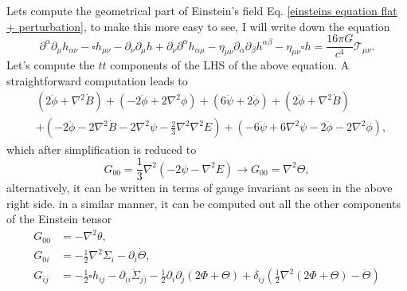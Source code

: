 \documentclass{article}
\begin{document}
Lets compute the geometrical part of Einstein's field Eq. 
\eqref{einsteins equation flat + perturbation}, to make this more easy to see, I will write 
down the equation
\begin{equation}
        \partial^{\alpha}\partial_{\mu}h_{\alpha\nu} 
        -  \square h_{\mu\nu} - \partial_{\nu}\partial_{\mu}h
        + \partial_{\nu}\partial^{\alpha}h_{\alpha\mu}
        - \eta_{\mu\nu}\partial_{\alpha}\partial_{\beta}h^{\alpha\beta} 
        - \eta_{\mu\nu}\square h = \frac{16\pi G}{c^4}\mathcal{T}_{\mu\nu}.
\end{equation}
Let's compute the $tt$ components of the LHS of the above equation. A straightforward
computation leads to
\begin{align}
    & \left(2\ddot{\phi} + \nabla^{2}\dot{B}\right) + \left(-2\ddot{\phi} + 2\nabla^2\phi\right)
    + \left(6\ddot{\psi} + 2\ddot{\phi}\right) + \left(2\ddot{\phi} + \nabla^2\dot{B}\right)\\
    & + \left(-2\ddot{\phi} - 2\nabla^2 \dot{B} -2\nabla^2\psi - \frac{2}{3}\nabla^2\nabla^2E\right)
    +\left(-6\ddot{\psi} + 6\nabla^2\psi -2\ddot{\phi} - 2\nabla^2\phi\right), 
\end{align}
which after simplification is reduced to
\begin{equation}
    G_{00} = \frac{1}{3}\nabla^2\left(-2\psi - \nabla^2 E\right) \to
    G_{00} = \nabla^2\Theta,
\end{equation}
alternatively, it can be written in terms of gauge invariant as seen in the above right side. in
a similar manner, it can be computed out all the other components of the Einstein tensor
\begin{align}
    G_{00} & = -\nabla^2\theta, \\
    G_{0i} & = -\frac{1}{2}\nabla^2\Sigma_i -\partial_{i}\dot{\Theta},\\
    G_{ij} & = -\frac{1}{2}\square h_{ij} - \partial_{(i}\dot{\Sigma}_{j)} - \frac{1}{2}\partial_{i}
    \partial_{j}\left(2\Phi + \Theta\right) + \delta_{ij}\left(\frac{1}{2}\nabla^2\left(2\Phi + \Theta\right)
    - \ddot{\Theta} \right)
\end{align}
\end{document}
